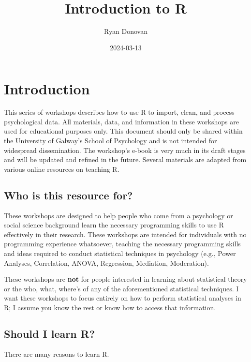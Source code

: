 \documentclass[
]{book}
\title{Introduction to R}
\author{Ryan Donovan}
\date{2024-03-13}
\begin{document}
\maketitle

{
\setcounter{tocdepth}{1}
\tableofcontents
}
\hypertarget{introduction}{%
\chapter{\texorpdfstring{\textbf{Introduction}}{Introduction}}\label{introduction}}

This series of workshops describes how to use R to import, clean, and process psychological data. All materials, data, and information in these workshops are used for educational purposes only. This document should only be shared within the University of Galway's School of Psychology and is not intended for widespread dissemination. The workshop's e-book is very much in its draft stages and will be updated and refined in the future. Several materials are adapted from various online resources on teaching R.

\hypertarget{who-is-this-resource-for}{%
\section{Who is this resource for?}\label{who-is-this-resource-for}}

These workshops are designed to help people who come from a psychology or social science background learn the necessary programming skills to use R effectively in their research. These workshops are intended for individuals with no programming experience whatsoever, teaching the necessary programming skills and ideas required to conduct statistical techniques in psychology (e.g., Power Analyses, Correlation, ANOVA, Regression, Mediation, Moderation).

These workshops are \textbf{not} for people interested in learning about statistical theory or the who, what, where's of any of the aforementioned statistical techniques. I want these workshops to focus entirely on how to perform statistical analyses in R; I assume you know the rest or know how to access that information.

\hypertarget{should-i-learn-r}{%
\section{Should I learn R?}\label{should-i-learn-r}}

There are many reasons to learn R.
\end{document}
